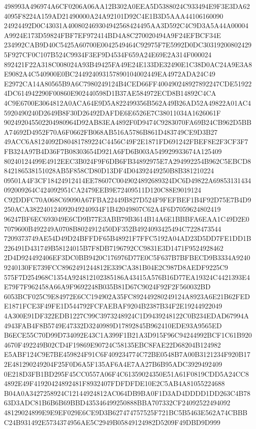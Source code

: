 \documentclass[UTF8,fontset=fandol,zihao=-4,a4paper]{ctexart}
\begin{document}
{{498993A496974A6CF0206A06AA12B302A0EEA5D5388024C933494E9F3E3DA624095F8224A159AD21490000A24A92101D92C4E1B3D5AAA44106160090
24924492D0C43031A400802469304942568424495AA3D592C4C9D3A5A44A00004A9924E173D59824FBF7EF972414BD4A8C270020494A9F24EFBCF34E
234992CAB9D40C5425A60700E0042549464C92975F7E5992D0DC303192008024295F927CF0C107B524C9934F3EF9D4534F659A24E69E2A314F000024
892421F22A318C008024A93B49425FA49E24E133DE32490E1C38D0AC24A9E3A8E9082A4C540900E0BC244924093157890104002449EA4972ADA24C49
E2972CA14A80565B9A6C7980249124B4CED66FF400490248927892247CDE519224DC614942290F00860E902440598D1B37AE584972ECD8B14892C4CA
4C9E6700E3064812A0ACA64E9D5A822499356B562A49B26AD52A49822A01AC45920490240D2649B8F30D26492DAFDE6E6526E7C38011034A1626061F
902492045502204980964D92AB83EA4892F0D9474C9283070FA69B24CB962D5BBA74692D4952F70A6F0662FB068AB516A5786B861D483749CE9D3B27
49ACC6A8124092D80481789224C4456C49F2E1871FD691242FBEF8E2F3CF3F7FB324A97B4D36F7B08303654D921A6FD6B003A549929933674A125409
80240124499E4912EEC3B024F9F6DB6FB34892975E7A294992254B962C5EBCD8842186538151028AB5F858CD80D13DF4D04392449250B8B381210224
09501A4F3CF18424912414EE78607C0049024892689324DC6D49822A69853131434092009264C424092951CA2479EEB9E72409511D120C88E9019124
C92DDFC70A068C69090A67FBA22449B827D524F9FEFBEF1B4F92D75E7B4D9250ACA382240124092049240934F1B42049807C62A4F6D7059624802419
96247BF6EC693049E6CD9B77E3ABB79B3614B14A6E1BBBFA6EAA1C49D2E07079600B492249A0708B8024912450DF352B4924093425494C7228473544
7209373749AE54D49D24BFFDF65B48921F7FFC5192A04AD23D5DD7FE1DD1B226491D431749B58124015B7F8DB7196792CC9831E3D1471F9524928462
2D4D924492406EF3DC0BB9420C176976D77E0C5F637B7BFBECD9B3334A92409240130FE739FCC8962491244812E339CA381B04E2C987D8AEDF9225C9
575F7D254968C1354A924812102385186A43415A576B16D77EA19324C4421393E4E79F7F962458A66A9F9692248B035B81D67C9024F92F2F560032BD
6053BCF025C9E84972E6CC194902A35FC892449280249124A8923A6E21B62FEDE1871FCE3F49FE1D544792FCFAEBAF9204B2387B34F2E19244922049
4A300E91DF322EDB1227C99C3973248924C1D9439248122C0B234EDAD67994A4943FAB4F8B5749E47332D3240989D17892845B962410EDE93A9565ED
B6ECE55C70D99D734092E43C1A399F1B21A3D915F96C94244992BCF1C61B9204670F492249B02CD4F19869E90724C58135EBC8FAE22D68204B124982
E5ABF124C9E7BE459824F91C6F409234774C72BE0548B7A00B3121234F920B172E481290249204F25F0D6A5F135AF6A4E7AA27B6B95ADC3929492409
0E218D3FB1BD295F45CC0557A06F4C61359024350E51A61F0819CDD5A24CC84892E49F41920424892481F8932407FDFDFDE10E2C5AB4A81055224688
B04A0A3427258924C12144924812AC064DB9BA0F1D3AD4DDDD1DD263C4B7863D3ADC81B6B6B69BBD435346499250888BBA707332CF24092522494092
48129024899E9E9EF029E6CE9D3B627474757525F721BC5B5463E562A74CBBBC24B931492E5734374956AE5C2949B05849124982D5209F49DBD9D999
}}
\end{document}
